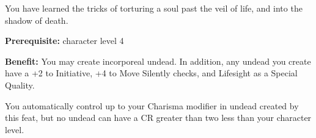 
You have learned the tricks of torturing a soul past the veil of life, and into the shadow of death.

\textbf{Prerequisite:} character level 4

\textbf{Benefit:} You may create incorporeal undead. In addition, any undead you create have a +2 to Initiative, +4 to Move Silently checks, and Lifesight as a Special Quality.

You automatically control up to your Charisma modifier in undead created by this feat, but no undead can have a CR greater than two less than your character level.
